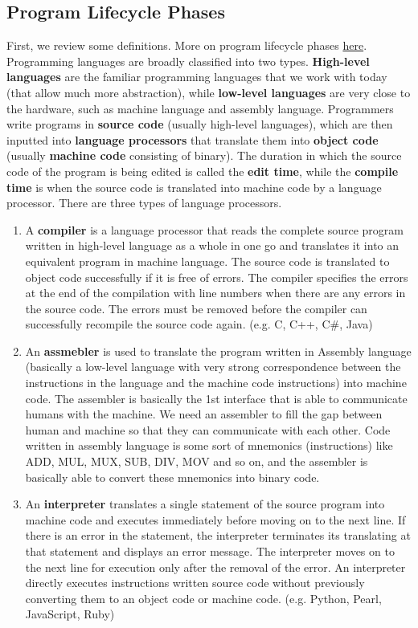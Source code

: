 \documentclass{article}
\begin{document}
  \subsection{Program Lifecycle Phases}

      First, we review some definitions. More on program lifecycle phases \href{https://en.wikipedia.org/wiki/Program_lifecycle_phase}{here}. Programming languages are broadly classified into two types. \textbf{High-level languages} are the familiar programming languages that we work with today (that allow much more abstraction), while \textbf{low-level languages} are very close to the hardware, such as machine language and assembly language. Programmers write programs in \textbf{source code} (usually high-level languages), which are then inputted into \textbf{language processors} that translate them into \textbf{object code} (usually \textbf{machine code} consisting of binary). The duration in which the source code of the program is being edited is called the \textbf{edit time}, while the \textbf{compile time} is when the source code is translated into machine code by a language processor. There are three types of language processors.
      \begin{enumerate}
        \item A \textbf{compiler} is a language processor that reads the complete source program written in high-level language as a whole in one go and translates it into an equivalent program in machine language. The source code is translated to object code successfully if it is free of errors. The compiler specifies the errors at the end of the compilation with line numbers when there are any errors in the source code. The errors must be removed before the compiler can successfully recompile the source code again. (e.g. C, C++, C\#, Java)
        
        \item An \textbf{assmebler} is used to translate the program written in Assembly language (basically a low-level language with very strong correspondence between the instructions in the language and the machine code instructions) into machine code. The assembler is basically the 1st interface that is able to communicate humans with the machine. We need an assembler to fill the gap between human and machine so that they can communicate with each other. Code written in assembly language is some sort of mnemonics (instructions) like ADD, MUL, MUX, SUB, DIV, MOV and so on, and the assembler is basically able to convert these mnemonics into binary code.

        \item An \textbf{interpreter} translates a single statement of the source program into machine code and executes immediately before moving on to the next line. If there is an error in the statement, the interpreter terminates its translating at that statement and displays an error message. The interpreter moves on to the next line for execution only after the removal of the error. An interpreter directly executes instructions written source code without previously converting them to an object code or machine code. (e.g. Python, Pearl, JavaScript, Ruby)
      \end{enumerate}
\end{document}
